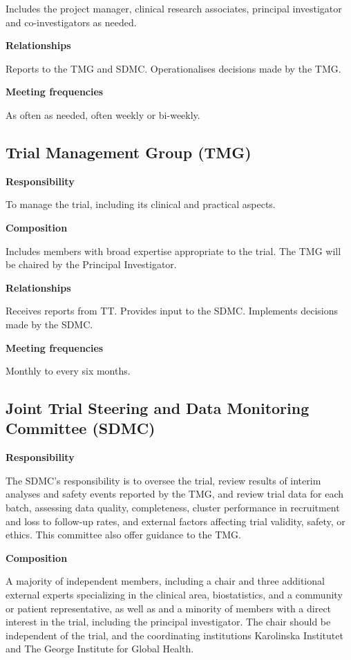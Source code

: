 \documentclass[
]{scrartcl}
\begin{document}
Includes the project manager, clinical research associates, principal
investigator and co-investigators as needed.

\textbf{Relationships}

Reports to the TMG and SDMC. Operationalises decisions made by the TMG.

\textbf{Meeting frequencies}

As often as needed, often weekly or bi-weekly.

\hypertarget{trial-management-group-tmg}{%
\subsection{Trial Management Group
(TMG)}\label{trial-management-group-tmg}}

\textbf{Responsibility}

To manage the trial, including its clinical and practical aspects.

\textbf{Composition}

Includes members with broad expertise appropriate to the trial. The TMG
will be chaired by the Principal Investigator.

\textbf{Relationships}

Receives reports from TT. Provides input to the SDMC. Implements
decisions made by the SDMC.

\textbf{Meeting frequencies}

Monthly to every six months.

\hypertarget{joint-trial-steering-and-data-monitoring-committee-sdmc}{%
\subsection{Joint Trial Steering and Data Monitoring Committee
(SDMC)}\label{joint-trial-steering-and-data-monitoring-committee-sdmc}}

\textbf{Responsibility}

The SDMC's responsibility is to oversee the trial, review results of
interim analyses and safety events reported by the TMG, and review trial
data for each batch, assessing data quality, completeness, cluster
performance in recruitment and loss to follow-up rates, and external
factors affecting trial validity, safety, or ethics. This committee also
offer guidance to the TMG.

\textbf{Composition}

A majority of independent members, including a chair and three
additional external experts specializing in the clinical area,
biostatistics, and a community or patient representative, as well as and
a minority of members with a direct interest in the trial, including the
principal investigator. The chair should be independent of the trial,
and the coordinating institutions Karolinska Institutet and The George
Institute for Global Health.
\end{document}
